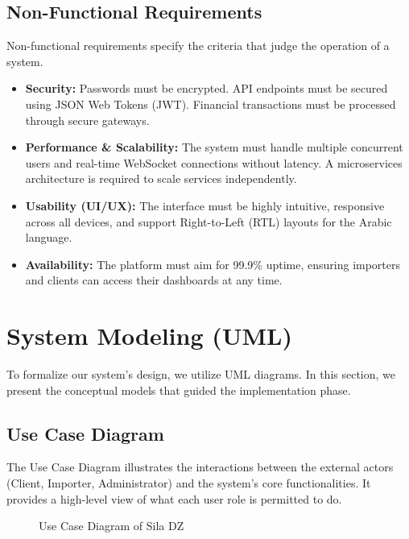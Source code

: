 \subsection{Non-Functional Requirements}
Non-functional requirements specify the criteria that judge the operation of a system.
\begin{itemize}
    \item \textbf{Security:} Passwords must be encrypted. API endpoints must be secured using JSON Web Tokens (JWT). Financial transactions must be processed through secure gateways.
    \item \textbf{Performance \& Scalability:} The system must handle multiple concurrent users and real-time WebSocket connections without latency. A microservices architecture is required to scale services independently.
    \item \textbf{Usability (UI/UX):} The interface must be highly intuitive, responsive across all devices, and support Right-to-Left (RTL) layouts for the Arabic language.
    \item \textbf{Availability:} The platform must aim for 99.9\% uptime, ensuring importers and clients can access their dashboards at any time.
\end{itemize}

\section{System Modeling (UML)}
To formalize our system's design, we utilize UML diagrams. In this section, we present the conceptual models that guided the implementation phase.

\subsection{Use Case Diagram}
The Use Case Diagram illustrates the interactions between the external actors (Client, Importer, Administrator) and the system's core functionalities. It provides a high-level view of what each user role is permitted to do.

\begin{figure}[H]
    \centering
    \vspace{8cm} %
    \caption{Use Case Diagram of Sila DZ}
    \label{fig:usecase}
\end{figure}

